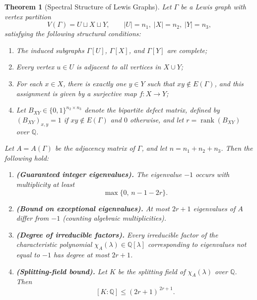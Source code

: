 \documentclass[10pt,a4paper]{amsart}
\newtheorem{thm}{Theorem}
\begin{document}
\begin{thm}[Spectral Structure of Lewis Graphs]\label{thm:LewisSpectralCorrected}
Let $\Gamma$ be a Lewis graph with vertex partition
\[
V(\Gamma)=U\sqcup X\sqcup Y, \qquad |U|=n_1,\; |X|=n_2,\; |Y|=n_3,
\]
satisfying the following structural conditions:
\begin{enumerate}[label=\upshape(\roman*)]
    \item The induced subgraphs $\Gamma[U]$, $\Gamma[X]$, and $\Gamma[Y]$ are complete;
    \item Every vertex $u\in U$ is adjacent to all vertices in $X\cup Y$;
    \item For each $x\in X$, there is exactly one $y\in Y$ such that $xy\notin E(\Gamma)$, and this assignment is given by a surjective map $f\colon X\to Y$;
    \item Let $B_{XY}\in\{0,1\}^{n_2\times n_3}$ denote the \emph{bipartite defect matrix}, defined by $(B_{XY})_{x,y}=1$ if $xy\notin E(\Gamma)$ and $0$ otherwise, and let $r=\operatorname{rank}(B_{XY})$ over $\mathbb{Q}$.
\end{enumerate}
Let $A=A(\Gamma)$ be the adjacency matrix of $\Gamma$, and let $n = n_1+n_2+n_3$. Then the following hold:
\begin{enumerate}[label=\upshape(\alph*)]
    \item \textbf{(Guaranteed integer eigenvalues).}
    The eigenvalue $-1$ occurs with multiplicity at least
    \[
      \max\{0,\, n - 1 - 2r\}.
    \]
    \item \textbf{(Bound on exceptional eigenvalues).}
    At most $2r+1$ eigenvalues of $A$ differ from $-1$ (counting algebraic multiplicities).
    \item \textbf{(Degree of irreducible factors).}
    Every irreducible factor of the characteristic polynomial $\chi_A(\lambda)\in\mathbb{Q}[\lambda]$ corresponding to eigenvalues not equal to $-1$ has degree at most $2r+1$.
    \item \textbf{(Splitting-field bound).}
    Let $K$ be the splitting field of $\chi_A(\lambda)$ over $\mathbb{Q}$. Then
    \[
      [K:\mathbb{Q}] \leq (2r+1)^{\,2r+1}.
    \]
\end{enumerate}
\end{thm}
\end{document}

